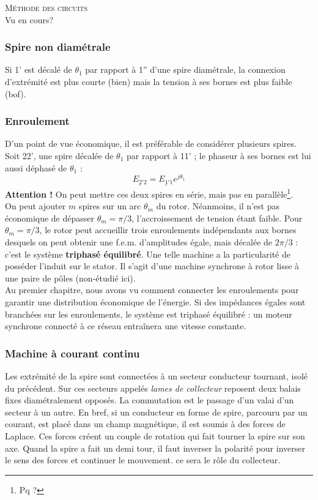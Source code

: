 		\textsc{Méthode des circuits}\\
		Vu en cours?
		
		
		\subsubsection{Spire non diamétrale}
		Si 1' est décalé de $\theta_1$ par rapport à 1'' d'une spire 
		diamétrale, la connexion d'extrémité est plus courte (bien) 
		mais la tension à ses bornes est plus faible (bof).
		
		\subsubsection{Enroulement}
		D'un point de vue économique, il est préférable de considérer 
		plusieurs spires. Soit 22', une spire décalée de $\theta_1$ 
		par rapport à 11' ; le phaseur à ses bornes est lui aussi 
		déphasé de $\theta_1$ :
		\begin{equation}
		\underline{E_{2'2}} = \underline{E_{1'1}}e^{j\theta_1}
		\end{equation}
		\textbf{Attention !} On peut mettre ces deux spires en série, 
		mais pas en parallèle\footnote{Pq ?}.\\
		
		On peut ajouter $m$ spires sur un arc $\theta_m$ du rotor. 
		Néanmoins, 	il n'est pas économique de dépasser $\theta_m = 
		\pi/3$, l'accroissement de tension étant faible. Pour $\theta_m = 
		\pi/3$, le rotor peut accueillir trois enroulements indépendants 
		aux bornes desquels on peut obtenir une f.e.m. d'amplitudes 
		égale, mais décalée de $2\pi/3$ : c'est le système \textbf{triphasé 
		équilibré}. Une telle machine a la particularité de posséder l'induit sur 
		le stator. Il s'agit d'une machine synchrone à rotor lisse à 
		une paire de pôles (non-étudié ici).\\
		
		Au premier chapitre, nous avons vu comment connecter les enroulements 
		pour garantir une distribution économique de l'énergie. Si des 
		impédances égales sont branchées sur les enroulements, le système 
		est triphasé équilibré : un moteur synchrone connecté à ce réseau 
		entraînera une vitesse constante.
		
		
		\subsubsection{Machine à courant continu}
		Les extrémité de la spire sont connectées à un secteur conducteur 
		tournant, isolé du précédent. Sur ces secteurs appelés \textit{lames 
		de collecteur} reposent deux balais fixes diamétralement opposés. La 
		commutation est le passage d'un valai d'un secteur à un autre. En bref, 
		si un conducteur en forme de spire, parcouru par un courant, est placé
		dans un champ magnétique, il est soumis à des forces de Laplace. Ces forces 
		créent un couple de rotation qui fait tourner la spire sur son axe. Quand 
		la spire a fait un demi tour, il faut inverser la polarité pour inverser le 
		sens des forces et continuer le mouvement. ce sera le rôle du collecteur.
		
